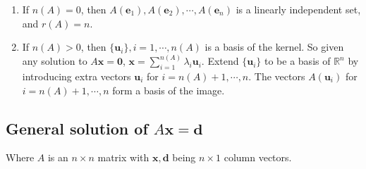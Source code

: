 \documentclass[a4paper]{article}
\theoremstyle{definition}
\newcommand{\mb}[1]{\mathbf{#1}}
\newcommand{\R}{\mathbb{R}}
\begin{document}
\begin{enumerate}
\item If $n(A) = 0$, then $A(\mb{e}_1), A(\mb{e}_2), \cdots, A(\mb{e}_n)$ is a linearly independent set, and $r(A) = n$.
\item If $n(A) > 0$, then $\{\mb{u}_i\}, i = 1, \cdots, n(A)$ is a basis of the kernel. So given any solution to $A\mb{x} = \mb{0}$, $\displaystyle \mb{x} = \sum_{i = 1}^{n(A)} \lambda_i \mb{u}_i$. Extend $\{\mb{u}_i\}$ to be a basis of $\R^n$ by introducing extra vectors $\mb{u}_{i}$ for $i = n(A) + 1, \cdots, n$. The vectors $A(\mb{u}_i)$ for $i = n(A) + 1, \cdots, n$ form a basis of the image.
\end{enumerate}

\subsection{General solution of \texorpdfstring{$A\mb{x} = \mb{d}$}{Ax = d}}
Where $A$ is an $n\times n$ matrix with $\mb{x, d}$ being $n \times 1$ column vectors.
\end{document}
